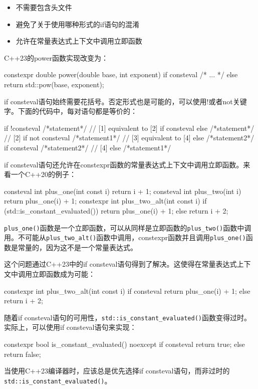 \begin{itemize}
\item
不需要包含头文件

\item
避免了关于使用哪种形式的if语句的混淆

\item
允许在常量表达式上下文中调用立即函数
\end{itemize}

C++23的power函数实现改变为：

\begin{cpp}
constexpr double power(double base, int exponent)
{
    if consteval
    {
        /* ... */
    }
    else
    {
        return std::pow(base, exponent);
    }
}
\end{cpp}

if consteval语句始终需要花括号。否定形式也是可能的，可以使用!或者not关键字。下面的代码中，每对语句都是等价的：

\begin{cpp}
if !consteval {/*statement*/}          // [1] equivalent to [2]
if consteval {} else {/*statement*/}   // [2]
if not consteval {/*statement1*/}      // [3] equivalent to [4]
else {/*statement2*/}
if consteval {/*statement2*/}          // [4]
else {/*statement1*/}
\end{cpp}

if consteval语句还允许在constexpr函数的常量表达式上下文中调用立即函数。来看一个C++20的例子：

\begin{cpp}
consteval int plus_one(int const i)
{
    return i + 1;
}
consteval int plus_two(int i)
{
    return plus_one(i) + 1;
}
constexpr int plus_two_alt(int const i)
{
    if (std::is_constant_evaluated())
    {
        return plus_one(i) + 1;
    }
    else
    {
        return i + 2;
    }
}
\end{cpp}

\verb|plus_one()|函数是一个立即函数，可以从同样是立即函数的\verb|plus_two()|函数中调用。不可能从\verb|plus_two_alt()|函数中调用，constexpr函数并且调用\verb|plus_one()|函数是常量的，因为这不是一个常量表达式。

这个问题通过C++23中的if consteval语句得到了解决。这使得在常量表达式上下文中调用立即函数成为可能：

\begin{cpp}
constexpr int plus_two_alt(int const i)
{
    if consteval
    {
        return plus_one(i) + 1;
    }
    else
    {
        return i + 2;
    }
}
\end{cpp}

随着if consteval语句的可用性，\verb|std::is_constant_evaluated()|函数变得过时。实际上，可以使用if consteval语句来实现：

\begin{cpp}
constexpr bool is_constant_evaluated() noexcept
{
    if consteval {
        return true;
    } else {
        return false;
    }
}
\end{cpp}

\begin{myNotic}
当使用C++23编译器时，应该总是优先选择if consteval语句，而非过时的\verb|std::is_constant_evaluated()|。
\end{myNotic}


